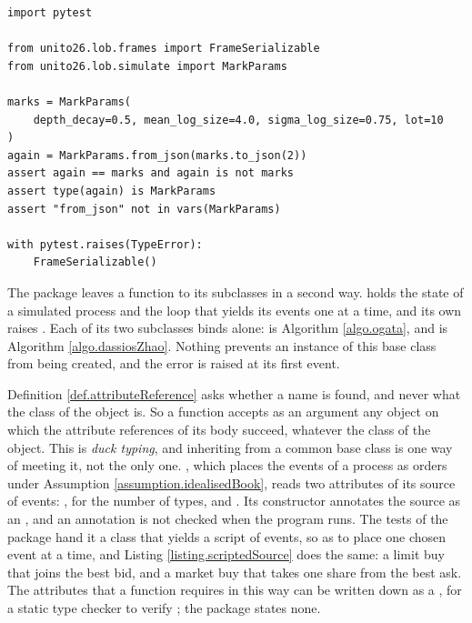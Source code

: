 \begin{lstlisting}[caption={A form inherited from the abstract class returns an instance of the subclass.}, label=listing.roundTrip]
import pytest

from unito26.lob.frames import FrameSerializable
from unito26.lob.simulate import MarkParams

marks = MarkParams(
    depth_decay=0.5, mean_log_size=4.0, sigma_log_size=0.75, lot=10
)
again = MarkParams.from_json(marks.to_json(2))
assert again == marks and again is not marks
assert type(again) is MarkParams
assert "from_json" not in vars(MarkParams)

with pytest.raises(TypeError):
    FrameSerializable()
\end{lstlisting}

\begin{remark}\label{remark.twoFormsOfAbstract}
 The package leaves a function to its subclasses in a second way.
  holds the state of a simulated process
 and the loop  that yields its events one  at a time,
 and its own  raises .
 Each of its two subclasses binds  alone:
  is Algorithm \ref{algo.ogata},
 and  is Algorithm \ref{algo.dassiosZhao}.
 Nothing prevents an instance of this base class from being created,
 and the error is raised at its first event.
\end{remark}

Definition \ref{def.attributeReference} asks whether a name is found,
and never what the class of the object is.
So a function accepts as an argument any object
on which the attribute references of its body succeed, whatever the class of the object.
This is \emph{duck typing},
and inheriting from a common base class is one way of meeting it, not the only one.
, which places the events of a process as orders
under Assumption \ref{assumption.idealisedBook},
reads two attributes of its source of events:
, for the number of types, and .
Its constructor annotates the source as an ,
and an annotation is not checked when the program runs.
The tests of the package hand it a class that yields a script of events,
so as to place one chosen event at a time,
and Listing \ref{listing.scriptedSource} does the same:
a limit buy that joins the best bid,
and a market buy that takes one share from the best ask.
The attributes that a function requires in this way can be written down
as a , for a static type checker to verify
\citep[Chapter 13]{Ram22flu};
the package states none.

